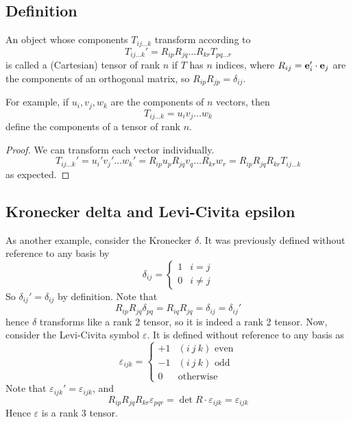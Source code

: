 \subsection{Definition}
\begin{definition}
	An object whose components \(T_{ij\dots k}\) transform according to
	\[
		T_{ij\dots k}' = R_{ip}R_{jq}\dots R_{kr} T_{pq\dots r}
	\]
	is called a (Cartesian) tensor of rank \(n\) if \(T\) has \(n\) indices, where \(R_{ij} = \vb e_i' \cdot \vb e_j\) are the components of an orthogonal matrix, so \(R_{ip} R_{jp} = \delta_{ij}\).
\end{definition}
For example, if \(u_i, v_j, w_k\) are the components of \(n\) vectors, then
\[
	T_{ij\dots k} = u_i v_j \dots w_k
\]
define the components of a tensor of rank \(n\).
\begin{proof}
	We can transform each vector individually.
	\[
		T_{ij\dots k}' = u_i' v_j' \dots w_k' = R_{ip}u_p R_{jq}v_q \dots R_{kr}w_r = R_{ip}R_{jq}R_{kr} T_{ij\dots k}
	\]
	as expected.
\end{proof}

\subsection{Kronecker delta and Levi-Civita epsilon}
As another example, consider the Kronecker \(\delta\).
It was previously defined without reference to any basis by
\[
	\delta_{ij} = \begin{cases}
		1 & i = j    \\
		0 & i \neq j
	\end{cases}
\]
So \(\delta_{ij}' = \delta_{ij}\) by definition.
Note that
\[
	R_{ip}R_{jq} \delta_{pq} = R_{iq}R_{jq} = \delta_{ij} = \delta_{ij}'
\]
hence \(\delta\) transforms like a rank 2 tensor, so it is indeed a rank 2 tensor.
Now, consider the Levi-Civita symbol \(\varepsilon\).
It is defined without reference to any basis as
\[
	\varepsilon_{ijk} = \begin{cases}
		+1 & (i\ j\ k) \text{ even} \\
		-1 & (i\ j\ k) \text{ odd}  \\
		0  & \text{otherwise}
	\end{cases}
\]
Note that \(\varepsilon_{ijk}' = \varepsilon_{ijk}\), and
\[
	R_{ip}R_{jq}R_{kr} \varepsilon_{pqr} = \det R \cdot \varepsilon_{ijk} = \varepsilon_{ijk}
\]
Hence \(\varepsilon\) is a rank 3 tensor.

